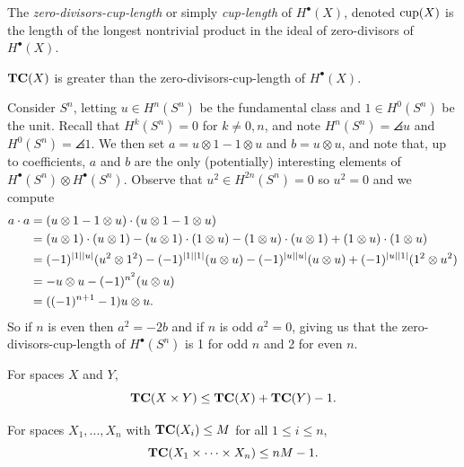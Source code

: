 \begin{definition}
    The \emph{zero-divisors-cup-length} or simply \emph{cup-length} of $H^\bullet (X)$, denoted $\operatorname{cup}(X)$ is the length of the longest nontrivial product in the ideal of zero-divisors of $H^\bullet (X)$.
\end{definition}

\begin{theorem}
    $\operatorname{\mathbf{TC}}(X)$ is greater than the zero-divisors-cup-length of $H^\bullet (X)$.
\end{theorem}

\begin{example}
    Consider $S^n$, letting $u \in H^n(S^n)$ be the fundamental class and $1 \in H^0(S^n)$ be the unit.
    Recall that $H^k(S^n) = 0$ for $k \neq 0,n$, and note $H^n(S^n) = \angles{u}$ and $H^0(S^n) = \angles{1}$.
    We then set $a = u \otimes 1 - 1 \otimes u$ and $b = u \otimes u$, and note that, up to coefficients, $a$ and $b$ are the only (potentially) interesting elements of $H^\bullet (S^n) \otimes H^\bullet (S^n)$.
    Observe that $u^2 \in H^{2n}(S^n) = 0$ so $u^2 = 0$ and we compute
    \begin{align*}
        a \cdot a
        &= (u \otimes 1 - 1 \otimes u) \cdot (u \otimes 1 - 1 \otimes u) \\
        &= (u \otimes 1) \cdot (u \otimes 1) - (u \otimes 1) \cdot (1 \otimes u) - (1 \otimes u) \cdot (u \otimes 1) + (1 \otimes u) \cdot (1 \otimes u) \\
        &= (-1)^{\left| 1 \right|\left| u \right|} (u^2 \otimes 1^2) - (-1)^{\left| 1 \right|\left| 1 \right|} (u \otimes u) - (-1)^{\left| u \right| \left| u \right|}(u \otimes u) + (-1)^{\left| u \right|\left| 1 \right|} (1^2 \otimes u^2) \\
        &= - u \otimes u - (-1)^{n^2} (u \otimes u) \\
        &= ((-1)^{n+1} - 1) u \otimes u.
    \end{align*}
    So if $n$ is even then $a^2 = -2b$ and if $n$ is odd $a^2 = 0$, giving us that the zero-divisors-cup-length of $H^\bullet(S^n)$ is 1 for odd $n$ and 2 for even $n$.
\end{example}

\begin{theorem}
    For spaces $X$ and $Y$,
    \[
        \operatorname{\mathbf{TC}}(X \times Y) \leq \operatorname{\mathbf{TC}}(X) + \operatorname{\mathbf{TC}}(Y) - 1.
    \]
\end{theorem}

\begin{corollary}\label{cor:tc-leq-linear}
    For spaces $X_1,...,X_n$ with $\operatorname{\mathbf{TC}}(X_i) \leq M$ for all $1 \leq i \leq n$,
    \[
        \operatorname{\mathbf{TC}}(X_1 \times \cdots \times X_n) \leq nM - 1.
    \]
\end{corollary}

